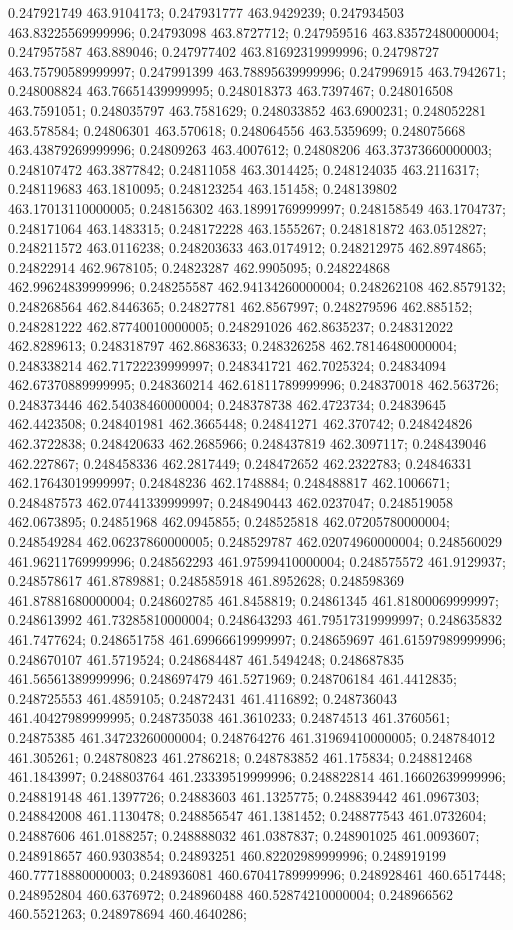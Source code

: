 0.247921749 463.9104173; 0.247931777 463.9429239; 0.247934503 463.83225569999996; 0.24793098 463.8727712; 0.247959516 463.83572480000004; 0.247957587 463.889046; 0.247977402 463.81692319999996; 0.24798727 463.75790589999997; 0.247991399 463.78895639999996; 0.247996915 463.7942671; 0.248008824 463.76651439999995; 0.248018373 463.7397467; 0.248016508 463.7591051; 0.248035797 463.7581629; 0.248033852 463.6900231; 0.248052281 463.578584; 0.24806301 463.570618; 0.248064556 463.5359699; 0.248075668 463.43879269999996; 0.24809263 463.4007612; 0.24808206 463.37373660000003; 0.248107472 463.3877842; 0.24811058 463.3014425; 0.248124035 463.2116317; 0.248119683 463.1810095; 0.248123254 463.151458; 0.248139802 463.17013110000005; 0.248156302 463.18991769999997; 0.248158549 463.1704737; 0.248171064 463.1483315; 0.248172228 463.1555267; 0.248181872 463.0512827; 0.248211572 463.0116238; 0.248203633 463.0174912; 0.248212975 462.8974865; 0.24822914 462.9678105; 0.24823287 462.9905095; 0.248224868 462.99624839999996; 0.248255587 462.94134260000004; 0.248262108 462.8579132; 0.248268564 462.8446365; 0.24827781 462.8567997; 0.248279596 462.885152; 0.248281222 462.87740010000005; 0.248291026 462.8635237; 0.248312022 462.8289613; 0.248318797 462.8683633; 0.248326258 462.78146480000004; 0.248338214 462.71722239999997; 0.248341721 462.7025324; 0.24834094 462.67370889999995; 0.248360214 462.61811789999996; 0.248370018 462.563726; 0.248373446 462.54038460000004; 0.248378738 462.4723734; 0.24839645 462.4423508; 0.248401981 462.3665448; 0.24841271 462.370742; 0.248424826 462.3722838; 0.248420633 462.2685966; 0.248437819 462.3097117; 0.248439046 462.227867; 0.248458336 462.2817449; 0.248472652 462.2322783; 0.24846331 462.17643019999997; 0.24848236 462.1748884; 0.248488817 462.1006671; 0.248487573 462.07441339999997; 0.248490443 462.0237047; 0.248519058 462.0673895; 0.24851968 462.0945855; 0.248525818 462.07205780000004; 0.248549284 462.06237860000005; 0.248529787 462.02074960000004; 0.248560029 461.96211769999996; 0.248562293 461.97599410000004; 0.248575572 461.9129937; 0.248578617 461.8789881; 0.248585918 461.8952628; 0.248598369 461.87881680000004; 0.248602785 461.8458819; 0.24861345 461.81800069999997; 0.248613992 461.73285810000004; 0.248643293 461.79517319999997; 0.248635832 461.7477624; 0.248651758 461.69966619999997; 0.248659697 461.61597989999996; 0.248670107 461.5719524; 0.248684487 461.5494248; 0.248687835 461.56561389999996; 0.248697479 461.5271969; 0.248706184 461.4412835; 0.248725553 461.4859105; 0.24872431 461.4116892; 0.248736043 461.40427989999995; 0.248735038 461.3610233; 0.24874513 461.3760561; 0.24875385 461.34723260000004; 0.248764276 461.31969410000005; 0.248784012 461.305261; 0.248780823 461.2786218; 0.248783852 461.175834; 0.248812468 461.1843997; 0.248803764 461.23339519999996; 0.248822814 461.16602639999996; 0.248819148 461.1397726; 0.24883603 461.1325775; 0.248839442 461.0967303; 0.248842008 461.1130478; 0.248856547 461.1381452; 0.248877543 461.0732604; 0.24887606 461.0188257; 0.248888032 461.0387837; 0.248901025 461.0093607; 0.248918657 460.9303854; 0.24893251 460.82202989999996; 0.248919199 460.77718880000003; 0.248936081 460.67041789999996; 0.248928461 460.6517448; 0.248952804 460.6376972; 0.248960488 460.52874210000004; 0.248966562 460.5521263; 0.248978694 460.4640286; 